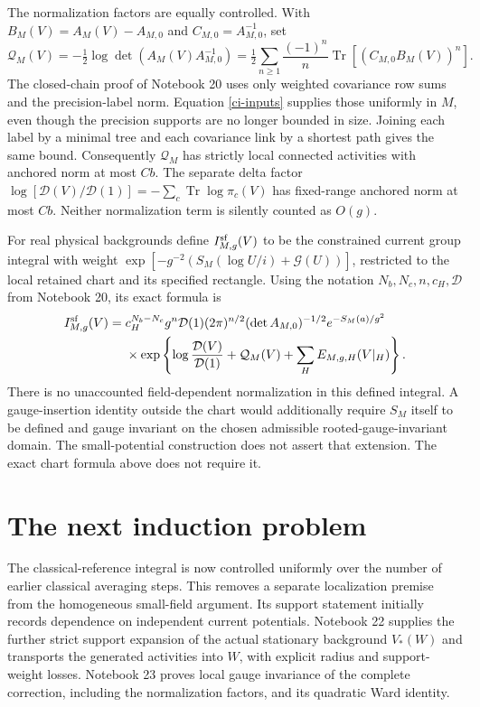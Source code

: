 The normalization factors are equally controlled. With
$B_M(V)=A_M(V)-A_{M,0}$ and $C_{M,0}=A_{M,0}^{-1}$, set
\begin{equation}\label{ci-det}
 \mathcal Q_M(V)=-\tfrac12\log\det(A_M(V)A_{M,0}^{-1})
   =\tfrac12\sum_{n\ge1}\frac{(-1)^n}{n}
                         \operatorname{Tr}[(C_{M,0}B_M(V))^n].
\end{equation}
The closed-chain proof of Notebook 20 uses only weighted
covariance row sums and the precision-label norm.
Equation \eqref{ci-inputs} supplies those uniformly in $M$,
even though the precision supports are no longer bounded
in size. Joining each label by a minimal tree and each
covariance link by a shortest path gives the same bound.
Consequently $\mathcal Q_M$ has strictly local connected
activities with anchored norm at most $Cb$. The separate
delta factor
$\log[\mathcal D(V)/\mathcal D(1)]=-\sum_c\operatorname{Tr}
\log\pi_c(V)$ has fixed-range anchored norm at most $Cb$.
Neither normalization term is silently counted as $O(g)$.

For real physical backgrounds define $I^{\rm sf}_{M,g}(V)$
to be the constrained current group integral with weight
$\exp[-g^{-2}(S_M(\log U/i)+\mathcal G(U))]$, restricted
to the local retained chart and its specified rectangle.
Using the notation $N_b,N_c,n,c_H,\mathcal D$ from
Notebook 20, its exact formula is
\begin{equation}\label{ci-exact}
 \begin{split}
 I^{\rm sf}_{M,g}(V)={}&
 c_H^{N_b-N_c}g^n\mathcal D(1)
       (2\pi)^{n/2}(\det A_{M,0})^{-1/2}
                       e^{-S_M(a)/g^2}\\
 &\times\exp\left\{
 \log\frac{\mathcal D(V)}{\mathcal D(1)}
       +\mathcal Q_M(V)+\sum_HE_{M,g,H}(V|_H)\right\}.
 \end{split}
\end{equation}
There is no unaccounted field-dependent normalization in
this defined integral. A gauge-insertion identity outside
the chart would additionally require $S_M$ itself to be
defined and gauge invariant on the chosen admissible
rooted-gauge-invariant domain. The small-potential construction
does not assert that extension. The exact chart formula above
does not require it.

\section{The next induction problem}
\label{ci-next}

The classical-reference integral is now controlled uniformly
over the number of earlier classical averaging steps.
This removes a separate localization premise from the
homogeneous small-field argument. Its support statement
initially records dependence on independent current potentials.
Notebook 22 supplies the further strict support expansion of
the actual stationary background $V_*(W)$ and transports the
generated activities into $W$, with explicit radius and
support-weight losses. Notebook 23 proves local gauge
invariance of the complete correction, including the
normalization factors, and its quadratic Ward identity.

